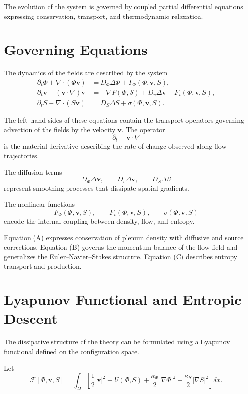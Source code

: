 \documentclass[11pt, openany]{book}
\theoremstyle{plain}
\theoremstyle{definition}
\theoremstyle{remark}
\begin{document}
The evolution of the system is governed by coupled partial differential
equations expressing conservation, transport, and thermodynamic
relaxation.

\section{Governing Equations}

The dynamics of the fields are described by the system
\begin{align}
\partial_t\Phi+\nabla\cdot(\Phi\mathbf{v})
&=D_\Phi\Delta\Phi+F_\Phi(\Phi,\mathbf{v},S), \tag{A}\\
\partial_t\mathbf{v}+(\mathbf{v}\cdot\nabla)\mathbf{v}
&=-\nabla P(\Phi,S)+D_v\Delta\mathbf{v}+F_v(\Phi,\mathbf{v},S), \tag{B}\\
\partial_t S+\nabla\cdot(S\mathbf{v})
&=D_S\Delta S+\sigma(\Phi,\mathbf{v},S). \tag{C}
\end{align}

The left–hand sides of these equations contain the transport operators
governing advection of the fields by the velocity $\mathbf{v}$.  The
operator
\[
\partial_t+\mathbf{v}\cdot\nabla
\]
is the material derivative describing the rate of change observed along
flow trajectories.

The diffusion terms
\[
D_\Phi\Delta\Phi,\qquad
D_v\Delta\mathbf{v},\qquad
D_S\Delta S
\]
represent smoothing processes that dissipate spatial gradients.

The nonlinear functions
\[
F_\Phi(\Phi,\mathbf{v},S),\qquad
F_v(\Phi,\mathbf{v},S),\qquad
\sigma(\Phi,\mathbf{v},S)
\]
encode the internal coupling between density, flow, and entropy.

Equation (A) expresses conservation of plenum density with diffusive and
source corrections.  Equation (B) governs the momentum balance of the
flow field and generalizes the Euler–Navier–Stokes structure.  Equation
(C) describes entropy transport and production.

\section{Lyapunov Functional and Entropic Descent}

The dissipative structure of the theory can be formulated using a
Lyapunov functional defined on the configuration space.

Let
\[
\mathcal{F}[\Phi,\mathbf{v},S]
=
\int_\Omega
\left[
\frac12|\mathbf{v}|^2
+
U(\Phi,S)
+
\frac{\kappa_\Phi}{2}|\nabla\Phi|^2
+
\frac{\kappa_S}{2}|\nabla S|^2
\right]dx .
\]
\end{document}
